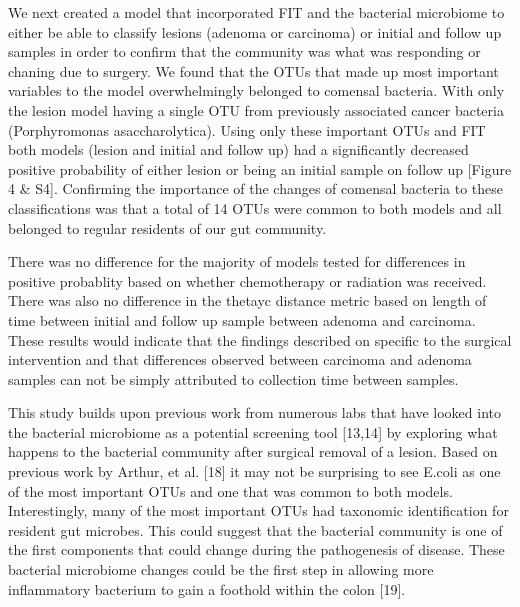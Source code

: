 \documentclass[12pt,]{article}
\begin{document}
We next created a model that incorporated FIT and the bacterial
microbiome to either be able to classify lesions (adenoma or carcinoma)
or initial and follow up samples in order to confirm that the community
was what was responding or chaning due to surgery. We found that the
OTUs that made up most important variables to the model overwhelmingly
belonged to comensal bacteria. With only the lesion model having a
single OTU from previously associated cancer bacteria (Porphyromonas
asaccharolytica). Using only these important OTUs and FIT both models
(lesion and initial and follow up) had a significantly decreased
positive probability of either lesion or being an initial sample on
follow up {[}Figure 4 \& S4{]}. Confirming the importance of the changes
of comensal bacteria to these classifications was that a total of 14
OTUs were common to both models and all belonged to regular residents of
our gut community.

There was no difference for the majority of models tested for
differences in positive probablity based on whether chemotherapy or
radiation was received. There was also no difference in the thetayc
distance metric based on length of time between initial and follow up
sample between adenoma and carcinoma. These results would indicate that
the findings described on specific to the surgical intervention and that
differences observed between carcinoma and adenoma samples can not be
simply attributed to collection time between samples.

This study builds upon previous work from numerous labs that have looked
into the bacterial microbiome as a potential screening tool {[}13,14{]}
by exploring what happens to the bacterial community after surgical
removal of a lesion. Based on previous work by Arthur, et al. {[}18{]}
it may not be surprising to see E.coli as one of the most important OTUs
and one that was common to both models. Interestingly, many of the most
important OTUs had taxonomic identification for resident gut microbes.
This could suggest that the bacterial community is one of the first
components that could change during the pathogenesis of disease. These
bacterial microbiome changes could be the first step in allowing more
inflammatory bacterium to gain a foothold within the colon {[}19{]}.
\end{document}
